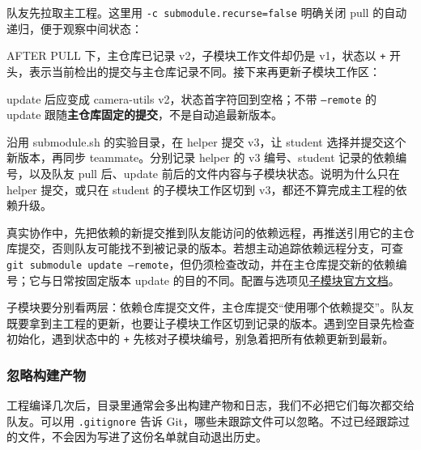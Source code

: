 \begin{example}[加入、克隆与更新相机工具子模块]
队友先拉取主工程。这里用 \texttt{-c submodule.recurse=false} 明确关闭 pull 的自动递归，便于观察中间状态：

AFTER PULL 下，主仓库已记录 v2，子模块工作文件却仍是 v1，状态以 \texttt{+} 开头，表示当前检出的提交与主仓库记录不同。接下来再更新子模块工作区：

update 后应变成 camera-utils v2，状态首字符回到空格；不带 \texttt{--remote} 的 update 跟随\textbf{主仓库固定的提交}，不是自动追最新版本。
\end{example}
\begin{exercise}\label{ex:v1-git-submodule}
沿用 submodule.sh 的实验目录，在 helper 提交 v3，让 student 选择并提交这个新版本，再同步 teammate。分别记录 helper 的 v3 编号、student 记录的依赖编号，以及队友 pull 后、update 前后的文件内容与子模块状态。说明为什么只在 helper 提交，或只在 student 的子模块工作区切到 v3，都还不算完成主工程的依赖升级。
\end{exercise}
真实协作中，先把依赖的新提交推到队友能访问的依赖远程，再推送引用它的主仓库提交，否则队友可能找不到被记录的版本。若想主动追踪依赖远程分支，可查 \texttt{git submodule update --remote}，但仍须检查改动，并在主仓库提交新的依赖编号；它与日常按固定版本 update 的目的不同。配置与选项见\href{https://git-scm.com/docs/git-submodule}{子模块官方文档}。
\begin{conclusion}
子模块要分别看两层：依赖仓库提交文件，主仓库提交“使用哪个依赖提交”。队友既要拿到主工程的更新，也要让子模块工作区切到记录的版本。遇到空目录先检查初始化，遇到状态中的 \texttt{+} 先核对子模块编号，别急着把所有依赖更新到最新。
\end{conclusion}

\subsubsection{忽略构建产物}
工程编译几次后，目录里通常会多出构建产物和日志，我们不必把它们每次都交给队友。可以用 \texttt{.gitignore} 告诉 Git，哪些未跟踪文件可以忽略。不过已经跟踪过的文件，不会因为写进了这份名单就自动退出历史。


